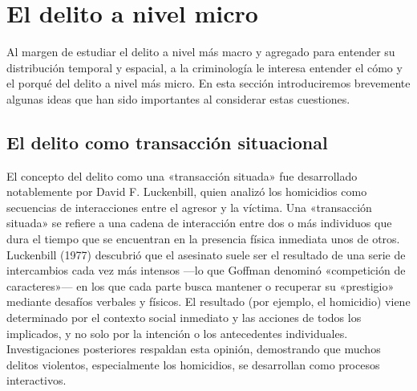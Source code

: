 \documentclass[
  spanish,
  letterpaper,
  DIV=11,
  numbers=noendperiod]{scrreprt}
\begin{document}
\section{El delito a nivel micro}\label{el-delito-a-nivel-micro}

Al margen de estudiar el delito a nivel más macro y agregado para
entender su distribución temporal y espacial, a la criminología le
interesa entender el cómo y el porqué del delito a nivel más micro. En
esta sección introduciremos brevemente algunas ideas que han sido
importantes al considerar estas cuestiones.

\subsection{El delito como transacción
situacional}\label{el-delito-como-transacciuxf3n-situacional}

El concepto del delito como una «transacción situada» fue desarrollado
notablemente por David F. Luckenbill, quien analizó los homicidios como
secuencias de interacciones entre el agresor y la víctima. Una
«transacción situada» se refiere a una cadena de interacción entre dos o
más individuos que dura el tiempo que se encuentran en la presencia
física inmediata unos de otros. Luckenbill (1977) descubrió que el
asesinato suele ser el resultado de una serie de intercambios cada vez
más intensos ---lo que Goffman denominó «competición de caracteres»---
en los que cada parte busca mantener o recuperar su «prestigio» mediante
desafíos verbales y físicos. El resultado (por ejemplo, el homicidio)
viene determinado por el contexto social inmediato y las acciones de
todos los implicados, y no solo por la intención o los antecedentes
individuales. Investigaciones posteriores respaldan esta opinión,
demostrando que muchos delitos violentos, especialmente los homicidios,
se desarrollan como procesos interactivos.
\end{document}
